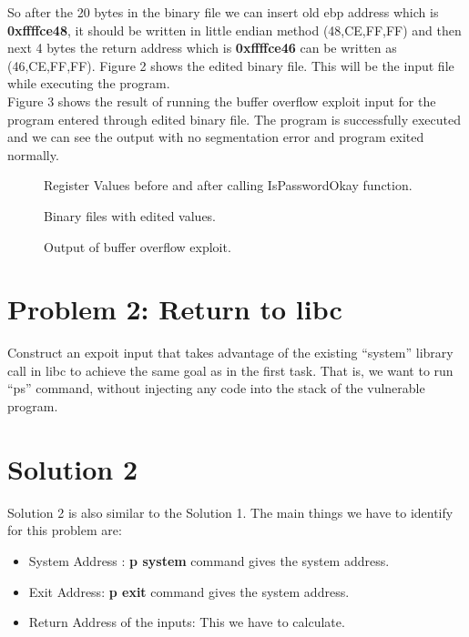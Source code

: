 \documentclass[a4paper, 11pt]{article}
\begin{document}
So after the 20 bytes in the binary file we can insert old ebp address which is \textbf{0xffffce48}, it should be written in little endian method (48,CE,FF,FF) and then next 4 bytes the return address which is \textbf{0xffffce46} can be written as (46,CE,FF,FF). Figure 2 shows the edited binary file. This will be the input file while executing the program.\\

Figure 3 shows the result of running the buffer overflow exploit input for the program entered through edited binary file. The program is successfully executed and we can see the output with no segmentation error and program exited normally.

\begin{figure}
	\centering
	\caption{Register Values before and after calling IsPasswordOkay function.}
\end{figure}
\begin{figure}
	\centering
	\caption{Binary files with edited values.}
\end{figure}
\begin{figure}
	\centering
	\caption{Output of buffer overflow exploit.}
\end{figure}
\newpage
\section*{Problem 2: Return to libc}
Construct an expoit input that takes advantage of the existing “system” library call in libc to achieve the same goal as in the first task. That is, we want to run “ps” command, without injecting any code into the stack of the vulnerable program.
\section*{Solution 2}
Solution 2 is also similar to the Solution 1. The main things we have to identify for this problem are:
\begin{itemize}
	\item System Address : \textbf{p system} command gives the system address.
	\item Exit Address: \textbf{p exit} command gives the system address.
	\item Return Address of the inputs: This we have to calculate.
\end{itemize}
\end{document}

